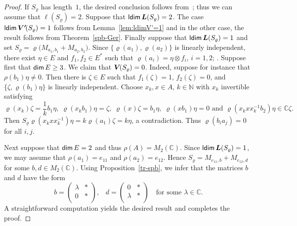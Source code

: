 \documentclass[a4paper,12pt,reqno]{amsart}
\numberwithin{equation}{section}
\theoremstyle{definition}
\begin{document}
\begin{proof}
If $S_\varrho$ has length~$1$, the desired conclusion follows from~\cite{CuMa}; thus we can assume that $\ell(S_\varrho)=2$.
Suppose that ${{\sf ldim}\,}{{\bm L(S_\varrho)}}=2$. The case ${{\sf ldim}\,}{{\bm{V'}\mkern-2.5mu(S_\varrho)}}=1$ follows from Lemma~\ref{lem:ldimV'=1} and in the other case,
the result follows from Theorem~\ref{spb-Ger}.
Finally suppose  that ${{\sf ldim}\,}{{\bm L(S_\varrho)}}= 1$ and set $S_\varrho= \varrho\bigl(M_{a_1,b_1}+M_{a_2,b_2}\bigr)$.
Since $\{\varrho(a_1),\varrho( a_2)\}$ is linearly independent, there exist $\eta \in E$ and $f_1, f_2 \in E^*$
such that $\varrho(a_i)= \eta \otimes f_i$, $i=1,2$; \cite[Theorem~2.3]{BrSe}. Suppose first that ${{\sf dim}\,} E \geq 3$.
We claim that ${{\bm V\mkern-2.5mu(S_\varrho)}}=0$. Indeed, suppose for instance that $\rho(b_1)\eta\neq0$.  Then there is  $\zeta \in E$
such that $f_1(\zeta)=1$, $f_2 (\zeta)=0$, and
$\{\zeta, \varrho(b_1) \eta\}$ is linearly independent. Choose $x_k, x \in A$, $k\in{\mathbb{N}}$ with $x_k$ invertible  satisfying
\begin{equation*}
\varrho(x_k)\zeta=\frac{1}{k}b_1\eta, \; \varrho(x_k b_1) \eta=\zeta, \; \varrho(x) \zeta=b_1 \eta,\;
\varrho(x b_1) \eta=0\text{ \ and \ }\varrho(x_k^{} x x_k^{-1} b_2) \eta \in {\mathbb{C}} \zeta.
\end{equation*}
Then $S_\varrho\varrho(x_k^{}xx_k^{-1}) \eta= k\varrho(a_1)\zeta=k \eta$, a contradiction.
Thus $\varrho(b_i a_j)=0$ for all $i,j$.

Next suppose that  ${{\sf dim}\,} E=2$ and thus $\rho (A)=M_2 (\mathbb C)$. Since ${{\sf ldim}\,}{{\bm L(S_\varrho)}}=1$, we may assume that
$\rho (a_1)= e_{11}$ and $\rho (a_2)= e_{12}$. Hence $S_\varrho=M_{e_{11},b}+M_{e_{12},d}$ for some $b,d\in M_2({\mathbb{C}})$.
Using Proposition~\ref{tr-spb}, we infer that the matrices $b$ and $d$ have the form
\begin{equation*}
b= \left(
     \begin{array}{cc}
       \lambda & * \\
       0 & * \\
     \end{array}
   \right), \;\;\;
d= \left(
     \begin{array}{cc}
       0 & * \\
       \lambda & * \\
     \end{array}
   \right)  \quad\text{for some }\lambda\in{\mathbb{C}}.
\end{equation*}
A straightforward computation yields the desired result and completes the proof.
\end{proof}
\end{document}
